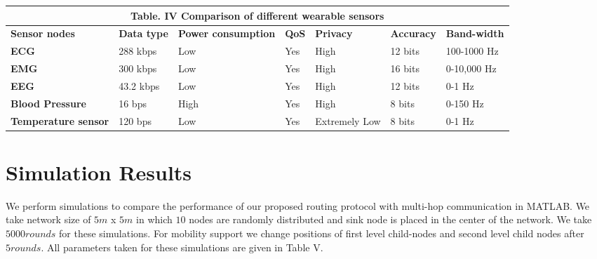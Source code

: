 \documentclass[journal]{IEEEtran}
\begin{document}
\begin{table*}[ht]
 \centering
\begin{tabular}{| p{3cm} || p{1.8cm} || p{2.5cm} || p{1.2cm} || p{1.5cm} || p{1.5cm}|| p{1.5cm}|}
  \multicolumn{7}{c}{Table. IV Comparison of different wearable sensors}\\
  \hline
  \textbf{Sensor nodes}&\textbf{Data type }&\textbf{Power consumption}&\textbf{QoS}&\textbf{Privacy}&\textbf{Accuracy}&\textbf{Band-width}  \\ \hline \hline
   \textbf{ECG} 	                & 288 kbps    &   Low    &  Yes      & High              & 12 bits  & 100-1000 Hz    \\ \hline
   \textbf{EMG}	                    & 300 kbps    &   Low	 &  Yes      & High              & 16 bits  & 0-10,000 Hz   \\ \hline
   \textbf{EEG} 	                & 43.2 kbps   &   Low    &  Yes      & High              & 12 bits  & 0-1 Hz         \\ \hline
   \textbf{Blood Pressure}          & 16 bps      &   High   &  Yes      & High              & 8 bits   & 0-150 Hz        \\ \hline
   \textbf{Temperature sensor } 	& 120 bps     &   Low	 &  Yes      & Extremely Low     & 8 bits   & 0-1 Hz          \\ \hline

\end{tabular}
\end{table*}
\section{Simulation Results}
We perform simulations to compare the performance of our proposed routing protocol with  multi-hop communication in MATLAB. We take network size of $5m$ x $5m$ in which $10$ nodes are randomly distributed and sink node is placed in the center of the network. We take $5000 rounds$ for these simulations. For mobility support we change positions of first level child-nodes and second level child nodes after $5 rounds$. All parameters taken for these simulations are given in Table V.
\end{document}
